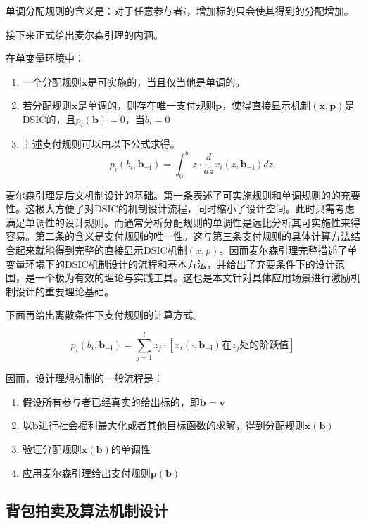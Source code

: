 \documentclass[promaster]{thesis-uestc}
\begin{document}
单调分配规则的含义是：对于任意参与者$i$，增加标的只会使其得到的分配增加。

接下来正式给出麦尔森引理的内涵。

\begin{theorem}[麦尔森引理]
    在单变量环境中：
    \begin{enumerate}
        \item 一个分配规则$\mathbf{x}$是可实施的，当且仅当他是单调的。
        \item 若分配规则$\mathbf{x}$是单调的，则存在唯一支付规则$\mathbf{p}$，使得直接显示机制$\mathbf{(x,p)}$是DSIC的，且$p_i(\mathbf{b})=0$，当$b_i=0$
        \item 上述支付规则可以由以下公式求得。
        $$p_i(b_i,\mathbf{b_{-i}})=\int_0^{b_i}{z\cdot\frac{d}{dz}x_i(z,\mathbf{b_{-i}})dz}$$
    \end{enumerate}
\end{theorem}

麦尔森引理是后文机制设计的基础。第一条表述了可实施规则和单调规则的的充要性。这极大方便了对DSIC的机制设计流程，同时缩小了设计空间。此时只需考虑满足单调性的设计规则。而通常分析分配规则的单调性是远比分析其可实施性来得容易。第二条的含义是支付规则的唯一性。这与第三条支付规则的具体计算方法结合起来就能得到完整的直接显示DSIC机制$(x,p)$。因而麦尔森引理完整描述了单变量环境下的DSIC机制设计的流程和基本方法，并给出了充要条件下的设计范围，是一个极为有效的理论与实践工具。这也是本文针对具体应用场景进行激励机制设计的重要理论基础。

下面再给出离散条件下支付规则的计算方式。

\begin{equation}
\label{myersonlisan}
p_i(b_i,\mathbf{b_{-i}})=\sum_{j=1}^l{z_j\cdot[x_i(\cdot,\mathbf{b_{-i}})\text{在}z_j\text{处的阶跃值}]}
\end{equation}

因而，设计理想机制的一般流程是：

\begin{enumerate}
    \item 假设所有参与者已经真实的给出标的，即$\mathbf{b} = \mathbf{v}$
    \item 以$\mathbf{b}$进行社会福利最大化或者其他目标函数的求解，得到分配规则$\mathbf{x(b)}$
    \item 验证分配规则$\mathbf{x(b)}$的单调性
    \item 应用麦尔森引理给出支付规则$\mathbf{p(b)}$
\end{enumerate}


\subsection{背包拍卖及算法机制设计}
\end{document}
